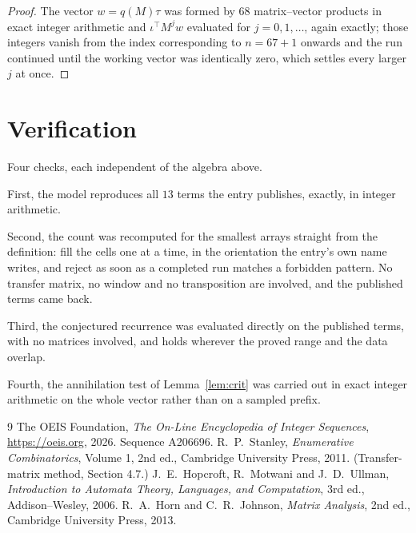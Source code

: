 \documentclass[11pt,a4paper]{article}
\theoremstyle{plain}
\theoremstyle{definition}
\begin{document}
\begin{proof}
The vector $w=q(M)\tau$ was formed by $68$ matrix--vector products in exact integer
arithmetic and $\iota^{\!\top}M^{j}w$ evaluated for $j=0,1,\dots$, again exactly; those
integers vanish from the index corresponding to $n=67+1$ onwards and the run continued
until the working vector was identically zero, which settles every larger $j$ at once.
\end{proof}

\section{Verification}

Four checks, each independent of the algebra above.

First, the model reproduces all $13$ terms the entry publishes, exactly, in integer
arithmetic.

Second, the count was recomputed for the smallest arrays straight from the definition: fill the
cells one at a time, in the orientation the entry's own name writes, and reject as soon as a
completed run matches a forbidden pattern. No transfer matrix, no window and no transposition
are involved, and the published terms came back.

Third, the conjectured recurrence was evaluated directly on the published terms, with no
matrices involved, and holds wherever the proved range and the data overlap.

Fourth, the annihilation test of Lemma~\ref{lem:crit} was carried out in exact integer
arithmetic on the whole vector rather than on a sampled prefix.

\begin{thebibliography}{9}
 The OEIS Foundation, \emph{The On-Line Encyclopedia of Integer
Sequences}, \url{https://oeis.org}, 2026. Sequence A206696.
 R.~P.~Stanley, \emph{Enumerative Combinatorics}, Volume 1, 2nd ed.,
Cambridge University Press, 2011. (Transfer-matrix method, Section 4.7.)
 J.~E.~Hopcroft, R.~Motwani and J.~D.~Ullman, \emph{Introduction to Automata
Theory, Languages, and Computation}, 3rd ed., Addison--Wesley, 2006.
 R.~A.~Horn and C.~R.~Johnson, \emph{Matrix Analysis}, 2nd ed., Cambridge
University Press, 2013.
\end{thebibliography}
\end{document}
